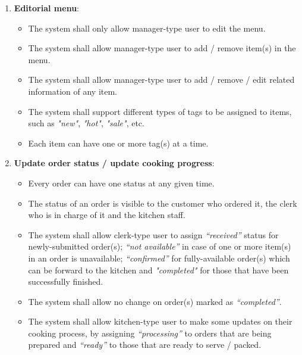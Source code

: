 \documentclass[12pt, a4paper]{article}
\theoremstyle{styleth}
\theoremstyle{styledef}
\begin{document}
\begin{enumerate}[label=\alph*., font=\itshape]
	\item \textbf{Editorial menu}:
	\begin{itemize}
		\item The system shall only allow manager-type user to edit the menu.
		\item The system shall allow manager-type user to add / remove item(s) in the menu.
		\item The system shall allow manager-type user to add / remove / edit related information of any item.
		\item The system shall support different types of tags to be assigned to items, such as \textit{"new"}, \textit{"hot"}, \textit{"sale"}, etc.
		\item Each item can have one or more tag(s) at a time.
	\end{itemize}

	\item \textbf{Update order status / update cooking progress}:
	\begin{itemize}
		\item Every order can have one status at any given time.
		\item The status of an order is visible to the customer who ordered it, the clerk who is in charge of it and the kitchen staff.
		\item The system shall allow clerk-type user to assign \textit{“received”} status for newly-submitted order(s); \textit{“not available”} in case of one or more item(s) in an order is unavailable; \textit{“confirmed”} for fully-available order(s) which can be forward to the kitchen and \textit{"completed"} for those that have been successfully finished.
		\item The system shall allow no change on order(s) marked as \textit{“completed”}.
		\item The system shall allow kitchen-type user to make some updates on their cooking process, by assigning \textit{“processing”} to orders that are being prepared and \textit{“ready”} to those that are ready to serve / packed.
	\end{itemize}
	

\end{enumerate}
\end{document}
